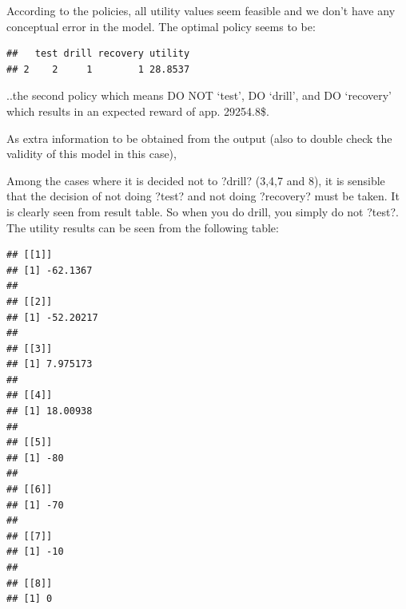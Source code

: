 \documentclass[
]{article}
\newenvironment{Shaded}{\begin{snugshade}}{\end{snugshade}}
\newcommand{\ControlFlowTok}[1]{\textcolor[rgb]{0.13,0.29,0.53}{\textbf{#1}}}
\newcommand{\FunctionTok}[1]{\textcolor[rgb]{0.00,0.00,0.00}{#1}}
\newcommand{\NormalTok}[1]{#1}
\newcommand{\SpecialCharTok}[1]{\textcolor[rgb]{0.00,0.00,0.00}{#1}}
\newcommand{\StringTok}[1]{\textcolor[rgb]{0.31,0.60,0.02}{#1}}
\begin{document}
According to the policies, all utility values seem feasible and we don't have any conceptual error in the model.
The optimal policy seems to be:

\begin{Shaded}
\end{Shaded}

\begin{verbatim}
##   test drill recovery utility
## 2    2     1        1 28.8537
\end{verbatim}

..the second policy which means DO NOT `test', DO `drill', and DO `recovery' which results in an expected reward of app. 29254.8\$.

As extra information to be obtained from the output (also to double check the validity of this model in this case),

Among the cases where it is decided not to ?drill? (3,4,7 and 8), it is sensible that the decision of not doing ?test? and not doing ?recovery? must be taken. It is clearly seen from result table.
So when you do drill, you simply do not ?test?. The utility results can be seen from the following table:

\begin{Shaded}
\end{Shaded}

\begin{verbatim}
## [[1]]
## [1] -62.1367
## 
## [[2]]
## [1] -52.20217
## 
## [[3]]
## [1] 7.975173
## 
## [[4]]
## [1] 18.00938
## 
## [[5]]
## [1] -80
## 
## [[6]]
## [1] -70
## 
## [[7]]
## [1] -10
## 
## [[8]]
## [1] 0
\end{verbatim}

\begin{Shaded}
\end{Shaded}
\end{document}
